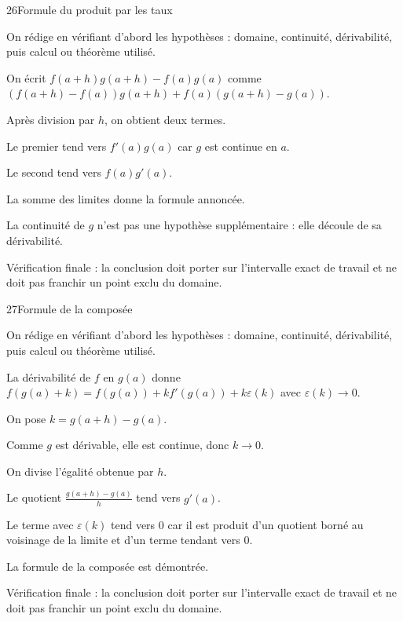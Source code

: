 \documentclass[11pt,a4paper]{article}
\begin{document}
\begin{corrbox}{26}{Formule du produit par les taux}

\begin{methodebox}
On rédige en vérifiant d'abord les hypothèses : domaine, continuité, dérivabilité, puis calcul ou théorème utilisé.
\end{methodebox}

On écrit $f(a+h)g(a+h)-f(a)g(a)$ comme $(f(a+h)-f(a))g(a+h)+f(a)(g(a+h)-g(a))$.


Après division par $h$, on obtient deux termes.


Le premier tend vers $f'(a)g(a)$ car $g$ est continue en $a$.


Le second tend vers $f(a)g'(a)$.


La somme des limites donne la formule annoncée.


La continuité de $g$ n'est pas une hypothèse supplémentaire : elle découle de sa dérivabilité.


\begin{attentionbox}
Vérification finale : la conclusion doit porter sur l'intervalle exact de travail et ne doit pas franchir un point exclu du domaine.
\end{attentionbox}

\end{corrbox}


\begin{corrbox}{27}{Formule de la composée}

\begin{methodebox}
On rédige en vérifiant d'abord les hypothèses : domaine, continuité, dérivabilité, puis calcul ou théorème utilisé.
\end{methodebox}

La dérivabilité de $f$ en $g(a)$ donne $f(g(a)+k)=f(g(a))+kf'(g(a))+k\varepsilon(k)$ avec $\varepsilon(k)\to0$.


On pose $k=g(a+h)-g(a)$.


Comme $g$ est dérivable, elle est continue, donc $k\to0$.


On divise l'égalité obtenue par $h$.


Le quotient $\frac{g(a+h)-g(a)}h$ tend vers $g'(a)$.


Le terme avec $\varepsilon(k)$ tend vers $0$ car il est produit d'un quotient borné au voisinage de la limite et d'un terme tendant vers $0$.


La formule de la composée est démontrée.


\begin{attentionbox}
Vérification finale : la conclusion doit porter sur l'intervalle exact de travail et ne doit pas franchir un point exclu du domaine.
\end{attentionbox}

\end{corrbox}
\end{document}
